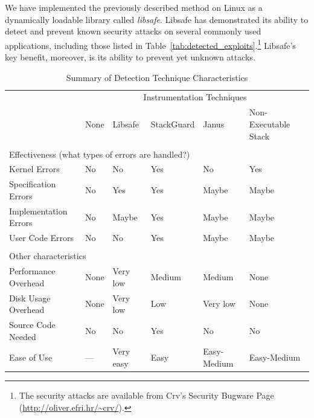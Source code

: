 \documentclass[]{article}
\begin{document}
We have implemented the previously described method on Linux as a
dynamically loadable library called {\em libsafe}.  Libsafe has
demonstrated its ability to detect and prevent known security attacks
on several commonly used applications, including those listed in
Table~\ref{tab:detected_exploits}.\footnote{The security attacks are
available from Crv's Security Bugware Page
(\url{http://oliver.efri.hr/~crv/}).}  Libsafe's key benefit,
moreover, is its ability to prevent yet unknown attacks.

\begin{table}[thbp]
\caption{Summary of Detection Technique Characteristics}
\label{tab:summary}
\begin{threeparttable}
\begin{center}
\begin{tabular}{|l||*{5}{p{.8in}|}} \hline
	& \multicolumn{5}{|c|}{Instrumentation Techniques} \\ \cline{2-6}
	& None
	& Libsafe
	& StackGuard
	& Janus 
	& Non-Executable Stack \\ \hline\hline

\multicolumn{6}{|c|}{} \\
\multicolumn{6}{|l|}{Effectiveness (what types of errors are handled?)} \\
\hline
Kernel Errors
	& No
	& No
	& Yes
	& No 
	& Yes \\ \hline
Specification Errors
	& No
	& Yes
	& Yes\tnote{a}
	& Maybe\tnote{b} 
	& Maybe\tnote{c} \\ \hline
Implementation Errors
	& No
	& Maybe\tnote{d}
	& Yes\tnote{a}
	& Maybe\tnote{b} 
	& Maybe\tnote{c} \\ \hline
User Code Errors
	& No
	& No
	& Yes
	& Maybe\tnote{b} 
	& Maybe\tnote{c} \\ \hline

\multicolumn{6}{|c|}{} \\
\multicolumn{6}{|l|}{Other characteristics} \\ \hline
Performance Overhead
	& None
	& Very low
	& Medium
	& Medium 
	& None \\ \hline
Disk Usage Overhead
	& None
	& Very low
	& Low
	& Very low 
	& None \\ \hline
Source Code Needed
	& No
	& No
	& Yes
	& No 
	& No \\ \hline
Ease of Use
	& ---
	& Very easy
	& Easy\tnote{e}
	& Easy-Medium\tnote{f} 
	& Easy-Medium\tnote{g} \\ \hline


\end{tabular}
\end{center}
\end{threeparttable}
\end{table}
\end{document}
